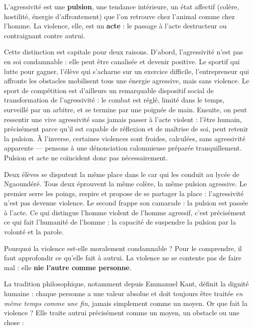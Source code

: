 \documentclass[11pt]{article}
\newcommand{\cle}[1]{{\popxbold\color{popdark}#1}}
\newcounter{popsec}
\newcounter{popsub}
\newcommand{\courssub}[1]{%
  \stepcounter{popsub}%
  \par\vspace{9pt}\noindent{\popxbold\fontsize{11.5}{13}\selectfont\color{popink}{\color{poporange}\thepopsec.\thepopsub}\hspace{6pt}#1}\par\nopagebreak\vspace{4pt}
}
\begin{document}
\begin{definition}
L'\cle{agressivité} est une \textbf{pulsion}, une tendance intérieure, un état affectif (colère, hostilité, énergie d'affrontement) que l'on retrouve chez l'animal comme chez l'homme. La \cle{violence}, elle, est un \textbf{acte} : le passage à l'acte destructeur ou contraignant contre autrui.
\end{definition}

Cette distinction est capitale pour deux raisons. D'abord, l'agressivité n'est pas en soi condamnable : elle peut être canalisée et devenir positive. Le sportif qui lutte pour gagner, l'élève qui s'acharne sur un exercice difficile, l'entrepreneur qui affronte les obstacles mobilisent tous une énergie agressive, mais sans violence. Le sport de compétition est d'ailleurs un remarquable dispositif social de transformation de l'agressivité : le combat est réglé, limité dans le temps, surveillé par un arbitre, et se termine par une poignée de main. Ensuite, on peut ressentir une vive agressivité sans jamais passer à l'acte violent : l'être humain, précisément parce qu'il est capable de réflexion et de maîtrise de soi, peut retenir la pulsion. À l'inverse, certaines violences sont froides, calculées, sans agressivité apparente — pensons à une dénonciation calomnieuse préparée tranquillement. Pulsion et acte ne coïncident donc pas nécessairement.

\begin{exemplebox}
Deux élèves se disputent la même place dans le car qui les conduit au lycée de Ngaoundéré. Tous deux éprouvent la même colère, la même pulsion agressive. Le premier serre les poings, respire et propose de se partager la place : l'agressivité n'est pas devenue violence. Le second frappe son camarade : la pulsion est passée à l'acte. Ce qui distingue l'homme violent de l'homme agressif, c'est précisément ce qui fait l'humanité de l'homme : la capacité de suspendre la pulsion par la volonté et la parole.
\end{exemplebox}

\courssub{La violence comme négation d'autrui}

Pourquoi la violence est-elle moralement condamnable ? Pour le comprendre, il faut approfondir ce qu'elle fait à autrui. La violence ne se contente pas de faire mal : elle \textbf{nie l'autre comme personne}.

La tradition philosophique, notamment depuis Emmanuel Kant, définit la \cle{dignité} humaine : chaque personne a une valeur absolue et doit toujours être traitée \emph{en même temps comme une fin}, jamais simplement comme un moyen. Or que fait la violence ? Elle traite autrui précisément comme un moyen, un obstacle ou une chose :
\end{document}
